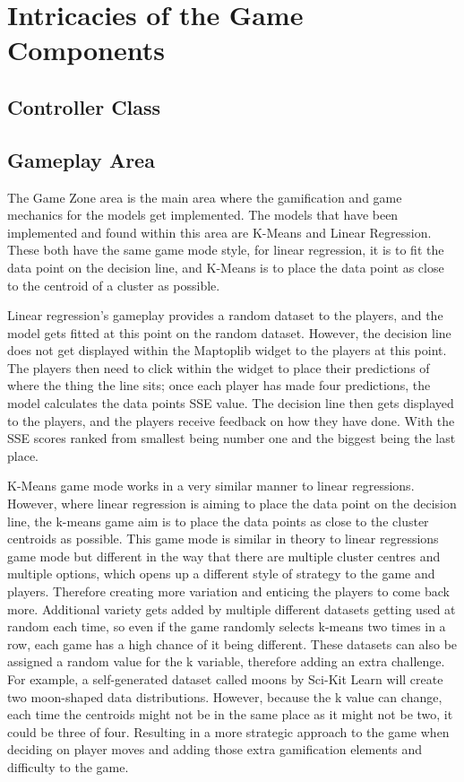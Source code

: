 	
	\section{Intricacies of the Game Components}
	\label{sec:packages_used}
	
	\subsection{Controller Class}
	
	
	
	\subsection{Gameplay Area}
		
		The Game Zone area is the main area where the gamification and game mechanics for the models get implemented.  The models that have been implemented and found within this area are K-Means and Linear Regression. These both have the same game mode style, for linear regression, it is to fit the data point on the decision line, and K-Means is to place the data point as close to the centroid of a cluster as possible. 
		
		Linear regression's gameplay provides a random dataset to the players, and the model gets fitted at this point on the random dataset. However, the decision line does not get displayed within the Maptoplib widget to the players at this point. The players then need to click within the widget to place their predictions of where the thing the line sits; once each player has made four predictions, the model calculates the data points SSE value. The decision line then gets displayed to the players, and the players receive feedback on how they have done. With the SSE scores ranked from smallest being number one and the biggest being the last place.
		
		K-Means game mode works in a very similar manner to linear regressions. However, where linear regression is aiming to place the data point on the decision line, the k-means game aim is to place the data points as close to the cluster centroids as possible. This game mode is similar in theory to linear regressions game mode but different in the way that there are multiple cluster centres and multiple options, which opens up a different style of strategy to the game and players. Therefore creating more variation and enticing the players to come back more. Additional variety gets added by multiple different datasets getting used at random each time, so even if the game randomly selects k-means two times in a row, each game has a high chance of it being different. These datasets can also be assigned a random value for the k variable, therefore adding an extra challenge. For example, a self-generated dataset called moons by Sci-Kit Learn will create two moon-shaped data distributions. However, because the k value can change, each time the centroids might not be in the same place as it might not be two, it could be three of four. Resulting in a more strategic approach to the game when deciding on player moves and adding those extra gamification elements and difficulty to the game.
		

